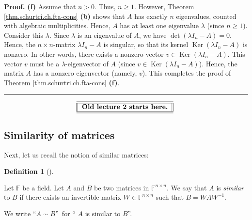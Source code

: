 \documentclass[numbers=enddot,12pt,final,onecolumn,notitlepage]{scrartcl}%
\numberwithin{exer}{subsection}
\theoremstyle{definition}
\newtheorem{defi}[theo]{Definition}
\newenvironment{definition}[1][]
{\begin{defi}[#1]\begin{leftbar}}
{\end{leftbar}\end{defi}}
\newenvironment{proof}[1][Proof]{\noindent\textbf{#1.} }{\ \rule{0.5em}{0.5em}}
\newenvironment{noncompile}{}{}
\begin{document}
\begin{proof}
\textbf{(f)} Assume that $n>0$. Thus, $n\geq1$. However, Theorem
\ref{thm.schurtri.ch.fta-cons} \textbf{(b)} shows that $A$ has exactly $n$
eigenvalues, counted with algebraic multiplicities. Hence, $A$ has at least
one eigenvalue $\lambda$ (since $n\geq1$). Consider this $\lambda$. Since
$\lambda$ is an eigenvalue of $A$, we have $\det\left(  \lambda I_{n}%
-A\right)  =0$. Hence, the $n\times n$-matrix $\lambda I_{n}-A$ is singular,
so that its kernel $\operatorname*{Ker}\left(  \lambda I_{n}-A\right)  $ is
nonzero. In other words, there exists a nonzero vector $v\in
\operatorname*{Ker}\left(  \lambda I_{n}-A\right)  $. This vector $v$ must be
a $\lambda$-eigenvector of $A$ (since $v\in\operatorname*{Ker}\left(  \lambda
I_{n}-A\right)  $). Hence, the matrix $A$ has a nonzero eigenvector (namely,
$v$). This completes the proof of Theorem \ref{thm.schurtri.ch.fta-cons}
\textbf{(f)}.
\end{proof}

\begin{noncompile}%
\[%
\begin{tabular}
[c]{||l||}\hline\hline
\textbf{Old lecture 2 starts here.}\\\hline\hline
\end{tabular}
\
\]

\end{noncompile}

\subsection{\label{sec.schur.similar}Similarity of matrices}

Next, let us recall the notion of similar matrices:

\begin{definition}
\label{def.schurtri.similar.def}Let $\mathbb{F}$ be a field. Let $A$ and $B$
be two matrices in $\mathbb{F}^{n\times n}$. We say that $A$ is \emph{similar}
to $B$ if there exists an invertible matrix $W\in\mathbb{F}^{n\times n}$ such
that $B=WAW^{-1}$.

We write \textquotedblleft$A\sim B$\textquotedblright\ for \textquotedblleft%
$A$ is similar to $B$\textquotedblright.
\end{definition}
\end{document}

